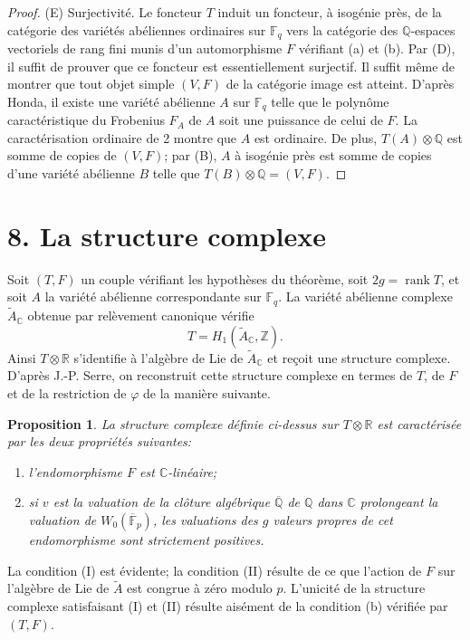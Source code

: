 \documentclass[12pt]{article}
\DeclareMathOperator{\rank}{rank}
\newcommand{\Z}{\mathbb{Z}}
\newcommand{\Q}{\mathbb{Q}}
\newcommand{\R}{\mathbb{R}}
\newcommand{\C}{\mathbb{C}}
\newcommand{\F}{\mathbb{F}}
\theoremstyle{plain}
\newtheorem{proposition}{Proposition}
\theoremstyle{definition}
\theoremstyle{remark}
\begin{document}
\begin{proof}
(E) Surjectivité. Le foncteur $T$ induit un foncteur, à isogénie près, de la catégorie des variétés abéliennes ordinaires sur $\F_q$ vers la catégorie des $\Q$-espaces vectoriels de rang fini munis d'un automorphisme $F$ vérifiant (a) et (b). Par (D), il suffit de prouver que ce foncteur est essentiellement surjectif. Il suffit même de montrer que tout objet simple $(V,F)$ de la catégorie image est atteint. D'après Honda, il existe une variété abélienne $A$ sur $\F_q$ telle que le polynôme caractéristique du Frobenius $F_A$ de $A$ soit une puissance de celui de $F$. La caractérisation ordinaire de 2 montre que $A$ est ordinaire. De plus, $T(A)\otimes\Q$ est somme de copies de $(V,F)$; par (B), $A$ à isogénie près est somme de copies d'une variété abélienne $B$ telle que $T(B)\otimes\Q=(V,F)$.
\end{proof}

\section*{8. La structure complexe}
Soit $(T,F)$ un couple vérifiant les hypothèses du théorème, soit $2g=\rank T$, et soit $A$ la variété abélienne correspondante sur $\F_q$. La variété abélienne complexe $\widetilde A_\C$ obtenue par relèvement canonique vérifie
\[
 T=H_1(\widetilde A_\C,\Z).
\]
Ainsi $T\otimes\R$ s'identifie à l'algèbre de Lie de $\widetilde A_\C$ et reçoit une structure complexe. D'après J.-P. Serre, on reconstruit cette structure complexe en termes de $T$, de $F$ et de la restriction de $\varphi$ de la manière suivante.

\begin{proposition}
La structure complexe définie ci-dessus sur $T\otimes\R$ est caractérisée par les deux propriétés suivantes:
\begin{enumerate}[label=(\Roman*)]
\item l'endomorphisme $F$ est $\C$-linéaire;
\item si $v$ est la valuation de la clôture algébrique $\overline{\Q}$ de $\Q$ dans $\C$ prolongeant la valuation de $W_0(\overline{\F}_p)$, les valuations des $g$ valeurs propres de cet endomorphisme sont strictement positives.
\end{enumerate}
\end{proposition}

La condition (I) est évidente; la condition (II) résulte de ce que l'action de $F$ sur l'algèbre de Lie de $\widetilde A$ est congrue à zéro modulo $p$. L'unicité de la structure complexe satisfaisant (I) et (II) résulte aisément de la condition (b) vérifiée par $(T,F)$.
\end{document}
